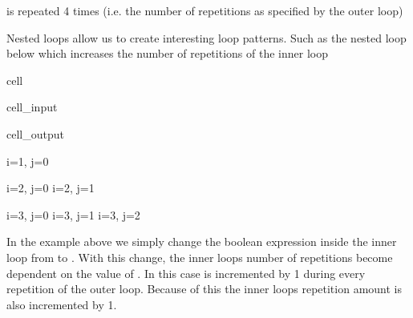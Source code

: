 \documentclass[letterpaper,10pt,english]{jupyterBook}
\begin{document}
\sphinxAtStartPar
is repeated 4 times (i.e. the number of repetitions as specified by the outer loop)

\sphinxAtStartPar
Nested loops allow us to create interesting loop patterns. Such as the nested loop below which increases the number of repetitions of the inner loop

\begin{sphinxuseclass}{cell}\begin{sphinxVerbatimInput}

\begin{sphinxuseclass}{cell_input}
\begin{sphinxVerbatim}[commandchars=\\\{\}]
  
   
      
        
                
            
     
        
\end{sphinxVerbatim}

\end{sphinxuseclass}\end{sphinxVerbatimInput}
\begin{sphinxVerbatimOutput}

\begin{sphinxuseclass}{cell_output}
\begin{sphinxVerbatim}[commandchars=\\\{\}]
i=1, j=0

i=2, j=0
i=2, j=1

i=3, j=0
i=3, j=1
i=3, j=2
\end{sphinxVerbatim}

\end{sphinxuseclass}\end{sphinxVerbatimOutput}

\end{sphinxuseclass}
\sphinxAtStartPar
In the example above we simply change the boolean expression inside the inner loop from  to . With this change, the inner loops number of repetitions become dependent on the value of . In this case  is incremented by 1 during every repetition of the outer loop. Because of this the inner loops repetition amount is also incremented by 1.
\end{document}
